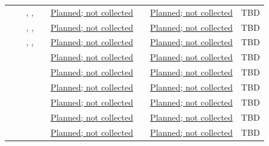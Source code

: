 \begin{landscape}
\begin{tabularx}{\linewidth}{L{1.7cm}L{2.3cm}L{2.5cm}L{1.8cm}YL{1.8cm}YL{1.4cm}}
 &  & , ,  &  & \hyperref[PlannedEvidence:VER-019]{Planned; not collected} &  & \hyperref[PlannedEvidence:VAL-007]{Planned; not collected} & TBD\\
 &  & , ,  &  & \hyperref[PlannedEvidence:VER-019]{Planned; not collected} &  & \hyperref[PlannedEvidence:VAL-008]{Planned; not collected} & TBD\\
 &  & , ,  &  & \hyperref[PlannedEvidence:VER-019]{Planned; not collected} &  & \hyperref[PlannedEvidence:VAL-004]{Planned; not collected} & TBD\\
 &  &  &  & \hyperref[PlannedEvidence:VER-020]{Planned; not collected} &  & \hyperref[PlannedEvidence:VAL-004]{Planned; not collected} & TBD\\
 &  &  &  & \hyperref[PlannedEvidence:VER-020]{Planned; not collected} &  & \hyperref[PlannedEvidence:VAL-005]{Planned; not collected} & TBD\\
 &  &  &  & \hyperref[PlannedEvidence:VER-021]{Planned; not collected} &  & \hyperref[PlannedEvidence:VAL-004]{Planned; not collected} & TBD\\
 &  &  &  & \hyperref[PlannedEvidence:VER-021]{Planned; not collected} &  & \hyperref[PlannedEvidence:VAL-007]{Planned; not collected} & TBD\\
 &  &  &  & \hyperref[PlannedEvidence:VER-022]{Planned; not collected} &  & \hyperref[PlannedEvidence:VAL-005]{Planned; not collected} & TBD\\
 &  &  &  & \hyperref[PlannedEvidence:VER-023]{Planned; not collected} &  & \hyperref[PlannedEvidence:VAL-005]{Planned; not collected} & TBD\\

\end{tabularx}
\end{landscape}
